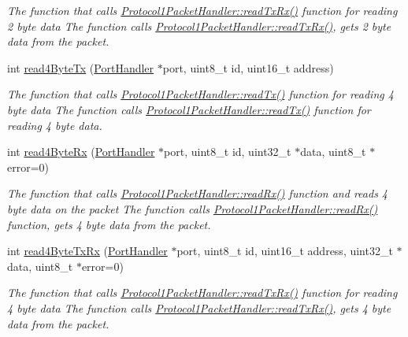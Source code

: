 \begin{DoxyCompactItemize}
\begin{DoxyCompactList}\small\item\em The function that calls \hyperlink{classmercury_1_1_protocol1_packet_handler_af7212497f4f00a05122cb6ac9702acec}{Protocol1\+Packet\+Handler\+::read\+Tx\+Rx()} function for reading 2 byte data  The function calls \hyperlink{classmercury_1_1_protocol1_packet_handler_af7212497f4f00a05122cb6ac9702acec}{Protocol1\+Packet\+Handler\+::read\+Tx\+Rx()},  gets 2 byte data from the packet. \end{DoxyCompactList}\item 
int \hyperlink{classmercury_1_1_protocol1_packet_handler_a2d6b95133b9f482292ac5ea3bfc2b231}{read4\+Byte\+Tx} (\hyperlink{classmercury_1_1_port_handler}{Port\+Handler} $\ast$port, uint8\+\_\+t id, uint16\+\_\+t address)
\begin{DoxyCompactList}\small\item\em The function that calls \hyperlink{classmercury_1_1_protocol1_packet_handler_a06f83e8acee5de4f733cc26a865602c3}{Protocol1\+Packet\+Handler\+::read\+Tx()} function for reading 4 byte data  The function calls \hyperlink{classmercury_1_1_protocol1_packet_handler_a06f83e8acee5de4f733cc26a865602c3}{Protocol1\+Packet\+Handler\+::read\+Tx()} function for reading 4 byte data. \end{DoxyCompactList}\item 
int \hyperlink{classmercury_1_1_protocol1_packet_handler_a7220c22e158c2bc4d8b5831ec40b28da}{read4\+Byte\+Rx} (\hyperlink{classmercury_1_1_port_handler}{Port\+Handler} $\ast$port, uint8\+\_\+t id, uint32\+\_\+t $\ast$data, uint8\+\_\+t $\ast$error=0)
\begin{DoxyCompactList}\small\item\em The function that calls \hyperlink{classmercury_1_1_protocol1_packet_handler_a341885c5f9539e30f03946ea17884d02}{Protocol1\+Packet\+Handler\+::read\+Rx()} function and reads 4 byte data on the packet  The function calls \hyperlink{classmercury_1_1_protocol1_packet_handler_a341885c5f9539e30f03946ea17884d02}{Protocol1\+Packet\+Handler\+::read\+Rx()} function,  gets 4 byte data from the packet. \end{DoxyCompactList}\item 
int \hyperlink{classmercury_1_1_protocol1_packet_handler_a08275e7d1280c904a287ac91857ffcdb}{read4\+Byte\+Tx\+Rx} (\hyperlink{classmercury_1_1_port_handler}{Port\+Handler} $\ast$port, uint8\+\_\+t id, uint16\+\_\+t address, uint32\+\_\+t $\ast$data, uint8\+\_\+t $\ast$error=0)
\begin{DoxyCompactList}\small\item\em The function that calls \hyperlink{classmercury_1_1_protocol1_packet_handler_af7212497f4f00a05122cb6ac9702acec}{Protocol1\+Packet\+Handler\+::read\+Tx\+Rx()} function for reading 4 byte data  The function calls \hyperlink{classmercury_1_1_protocol1_packet_handler_af7212497f4f00a05122cb6ac9702acec}{Protocol1\+Packet\+Handler\+::read\+Tx\+Rx()},  gets 4 byte data from the packet. \end{DoxyCompactList}\item 

\end{DoxyCompactItemize}
